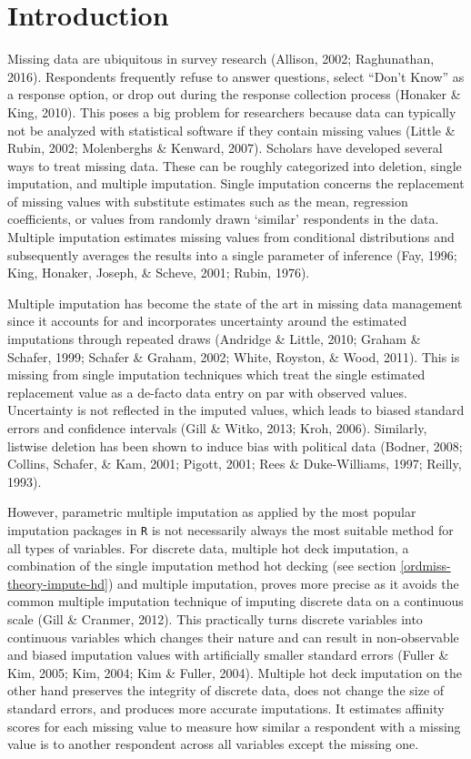 \documentclass[12pt,econ]{sources/authesis}
\begin{document}
\hypertarget{ordmiss-intro}{%
\section{Introduction}\label{ordmiss-intro}}

Missing data are ubiquitous in survey research (Allison, 2002; Raghunathan, 2016). Respondents frequently refuse to answer questions, select ``Don't Know'' as a response option, or drop out during the response collection process (Honaker \& King, 2010). This poses a big problem for researchers because data can typically not be analyzed with statistical software if they contain missing values (Little \& Rubin, 2002; Molenberghs \& Kenward, 2007). Scholars have developed several ways to treat missing data. These can be roughly categorized into deletion, single imputation, and multiple imputation. Single imputation concerns the replacement of missing values with substitute estimates such as the mean, regression coefficients, or values from randomly drawn `similar' respondents in the data. Multiple imputation estimates missing values from conditional distributions and subsequently averages the results into a single parameter of inference (Fay, 1996; King, Honaker, Joseph, \& Scheve, 2001; Rubin, 1976).

Multiple imputation has become the state of the art in missing data management since it accounts for and incorporates uncertainty around the estimated imputations through repeated draws (Andridge \& Little, 2010; Graham \& Schafer, 1999; Schafer \& Graham, 2002; White, Royston, \& Wood, 2011). This is missing from single imputation techniques which treat the single estimated replacement value as a de-facto data entry on par with observed values. Uncertainty is not reflected in the imputed values, which leads to biased standard errors and confidence intervals (Gill \& Witko, 2013; Kroh, 2006). Similarly, listwise deletion has been shown to induce bias with political data (Bodner, 2008; Collins, Schafer, \& Kam, 2001; Pigott, 2001; Rees \& Duke-Williams, 1997; Reilly, 1993).

However, parametric multiple imputation as applied by the most popular imputation packages in \texttt{R} is not necessarily always the most suitable method for all types of variables. For discrete data, multiple hot deck imputation, a combination of the single imputation method hot decking (see section \ref{ordmiss-theory-impute-hd}) and multiple imputation, proves more precise as it avoids the common multiple imputation technique of imputing discrete data on a continuous scale (Gill \& Cranmer, 2012). This practically turns discrete variables into continuous variables which changes their nature and can result in non-observable and biased imputation values with artificially smaller standard errors (Fuller \& Kim, 2005; Kim, 2004; Kim \& Fuller, 2004). Multiple hot deck imputation on the other hand preserves the integrity of discrete data, does not change the size of standard errors, and produces more accurate imputations. It estimates affinity scores for each missing value to measure how similar a respondent with a missing value is to another respondent across all variables except the missing one.
\end{document}
